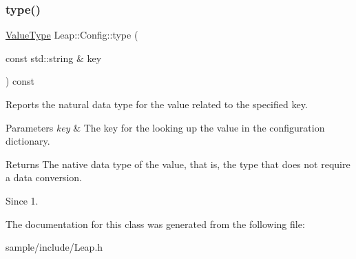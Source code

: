 \subsubsection{\texorpdfstring{type()}{type()}}
{\footnotesize\ttfamily \hyperlink{class_leap_1_1_config_aee9819af7eacacc324aa72619310a9d8}{Value\+Type} Leap\+::\+Config\+::type (\begin{DoxyParamCaption}\item[{const std\+::string \&}]{key }\end{DoxyParamCaption}) const\hspace{0.3cm}{\ttfamily [inline]}}

Reports the natural data type for the value related to the specified key.


\begin{DoxyCodeInclude}
\end{DoxyCodeInclude}



\begin{DoxyParams}{Parameters}
{\em key} & The key for the looking up the value in the configuration dictionary. \\
\hline
\end{DoxyParams}
\begin{DoxyReturn}{Returns}
The native data type of the value, that is, the type that does not require a data conversion. 
\end{DoxyReturn}
\begin{DoxySince}{Since}
1. 
\end{DoxySince}


The documentation for this class was generated from the following file\+:\begin{DoxyCompactItemize}
\item 
sample/include/Leap.\+h\end{DoxyCompactItemize}
